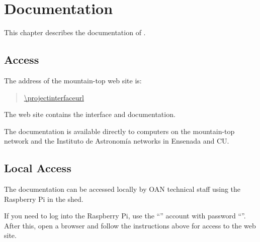 \chapter{Documentation}
\label{chapter:documentation}

This chapter describes the documentation of {\projectname}.

\section{Access}

The address of the {\projectname} mountain-top web site is:
\begin{quotation}
\url{\projectinterfaceurl}
\end{quotation}

The web site contains the interface and documentation.

The documentation is available directly to computers on the mountain-top network and the Instituto de Astronomía networks in Ensenada and CU.

\section{Local Access}
\label{section:documentation-local-access}

The documentation can be accessed locally by OAN technical staff using the Raspberry Pi in the shed.

If you need to log into the Raspberry Pi, use the “{\projectaccount}” account with password “{\projectaccount}”. After this, open a browser and follow the instructions above for access to the web site.
